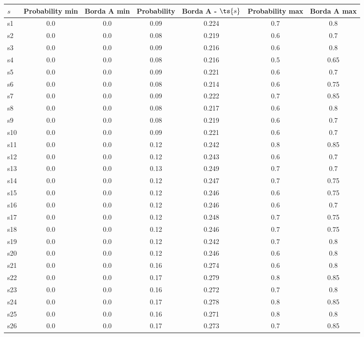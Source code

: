 \documentclass{article}
\begin{document}
\noindent\begin{tabular}{|l|c|c|c|c|c|c|}
\hline
$s$& Probability min & Borda A min & Probability & Borda A - $\ts{s}$ & Probability max & Borda A max\\
\hline
s1 &0.0 & 0.0 & 0.09 & 0.224 & 0.7 & 0.8\\
\hline
s2 &0.0 & 0.0 & 0.08 & 0.219 & 0.6 & 0.7\\
\hline
s3 &0.0 & 0.0 & 0.09 & 0.216 & 0.6 & 0.8\\
\hline
s4 &0.0 & 0.0 & 0.08 & 0.216 & 0.5 & 0.65\\
\hline
s5 &0.0 & 0.0 & 0.09 & 0.221 & 0.6 & 0.7\\
\hline
s6 &0.0 & 0.0 & 0.08 & 0.214 & 0.6 & 0.75\\
\hline
s7 &0.0 & 0.0 & 0.09 & 0.222 & 0.7 & 0.85\\
\hline
s8 &0.0 & 0.0 & 0.08 & 0.217 & 0.6 & 0.8\\
\hline
s9 &0.0 & 0.0 & 0.08 & 0.219 & 0.6 & 0.7\\
\hline
s10 &0.0 & 0.0 & 0.09 & 0.221 & 0.6 & 0.7\\
\hline
s11 &0.0 & 0.0 & 0.12 & 0.242 & 0.8 & 0.85\\
\hline
s12 &0.0 & 0.0 & 0.12 & 0.243 & 0.6 & 0.7\\
\hline
s13 &0.0 & 0.0 & 0.13 & 0.249 & 0.7 & 0.7\\
\hline
s14 &0.0 & 0.0 & 0.12 & 0.247 & 0.7 & 0.75\\
\hline
s15 &0.0 & 0.0 & 0.12 & 0.246 & 0.6 & 0.75\\
\hline
s16 &0.0 & 0.0 & 0.12 & 0.246 & 0.6 & 0.7\\
\hline
s17 &0.0 & 0.0 & 0.12 & 0.248 & 0.7 & 0.75\\
\hline
s18 &0.0 & 0.0 & 0.12 & 0.246 & 0.7 & 0.75\\
\hline
s19 &0.0 & 0.0 & 0.12 & 0.242 & 0.7 & 0.8\\
\hline
s20 &0.0 & 0.0 & 0.12 & 0.246 & 0.6 & 0.8\\
\hline
s21 &0.0 & 0.0 & 0.16 & 0.274 & 0.6 & 0.8\\
\hline
s22 &0.0 & 0.0 & 0.17 & 0.279 & 0.8 & 0.85\\
\hline
s23 &0.0 & 0.0 & 0.16 & 0.272 & 0.7 & 0.8\\
\hline
s24 &0.0 & 0.0 & 0.17 & 0.278 & 0.8 & 0.85\\
\hline
s25 &0.0 & 0.0 & 0.16 & 0.271 & 0.8 & 0.8\\
\hline
s26 &0.0 & 0.0 & 0.17 & 0.273 & 0.7 & 0.85\\

\end{tabular}
\end{document}
